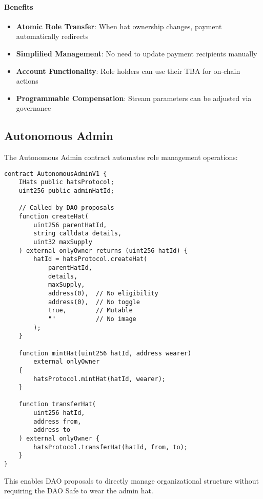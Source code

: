\documentclass[11pt,a4paper]{article}
\begin{document}
\paragraph{Benefits}

\begin{itemize}
    \item \textbf{Atomic Role Transfer}: When hat ownership changes, payment automatically redirects
    \item \textbf{Simplified Management}: No need to update payment recipients manually
    \item \textbf{Account Functionality}: Role holders can use their TBA for on-chain actions
    \item \textbf{Programmable Compensation}: Stream parameters can be adjusted via governance
\end{itemize}

\subsection{Autonomous Admin}

The Autonomous Admin contract automates role management operations:

\begin{lstlisting}[caption=Autonomous Admin Structure]
contract AutonomousAdminV1 {
    IHats public hatsProtocol;
    uint256 public adminHatId;

    // Called by DAO proposals
    function createHat(
        uint256 parentHatId,
        string calldata details,
        uint32 maxSupply
    ) external onlyOwner returns (uint256 hatId) {
        hatId = hatsProtocol.createHat(
            parentHatId,
            details,
            maxSupply,
            address(0),  // No eligibility
            address(0),  // No toggle
            true,        // Mutable
            ""           // No image
        );
    }

    function mintHat(uint256 hatId, address wearer)
        external onlyOwner
    {
        hatsProtocol.mintHat(hatId, wearer);
    }

    function transferHat(
        uint256 hatId,
        address from,
        address to
    ) external onlyOwner {
        hatsProtocol.transferHat(hatId, from, to);
    }
}
\end{lstlisting}

This enables DAO proposals to directly manage organizational structure without requiring the DAO Safe to wear the admin hat.
\end{document}
